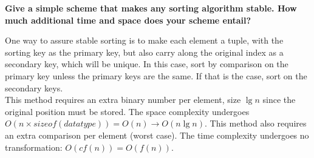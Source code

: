 \documentclass[10pt,fullpage]{article}
\begin{document}
\textbf{Give a simple scheme that makes any sorting algorithm
stable. How much additional time and space does your scheme
entail?}

One way to assure stable sorting is to make each element a tuple,
with the sorting key as the primary key, but also carry along the
original index as a secondary key, which will be unique. In this
case, sort by comparison on the primary key unless the primary
keys are the same. If that is the case, sort on the secondary
keys.\\

This method requires an extra binary number per element, size $\lg
n$ since the original position must be stored. The space
complexity undergoes $O(n \times sizeof(datatype)) = O(n)
\longrightarrow O(n \lg n)$. This method also requires an extra
comparison per element (worst case). The time complexity undergoes
no transformation: $O(c f(n)) = O(f(n))$.
\end{document}
